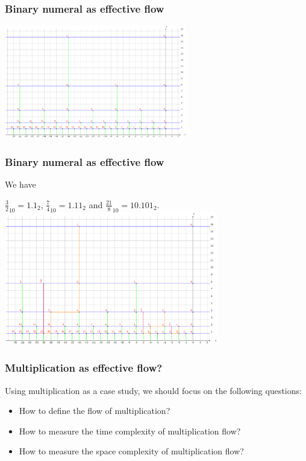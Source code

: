 \documentclass[aspectratio=169]{beamer}
\begin{document}
\begin{frame}
    \frametitle{Binary numeral as effective flow}
    \begin{center}
        \includegraphics[width=0.6\textwidth]{../images/binarynumeral}
    \end{center}
\end{frame}

\begin{frame}
    \frametitle{Binary numeral as effective flow}
    We have
    \begin{center}
         $\frac{3}{2}_{10} = 1.1_{2}$,  $\frac{7}{4}_{10} = 1.11_{2}$ and $\frac{21}{8}_{10} = 10.101_{2}$.
        \includegraphics[width=0.7\textwidth]{../images/multiplication}
    \end{center}
\end{frame}

\begin{frame}
    \frametitle{Multiplication as effective flow?}
    Using multiplication as a case study, we should focus on the following questions:
    \begin{itemize}
        \item How to define the flow of multiplication?
        \item How to measure the time complexity of multiplication flow?
        \item How to measure the space complexity of multiplication flow?
    \end{itemize}
\end{frame}
\end{document}
